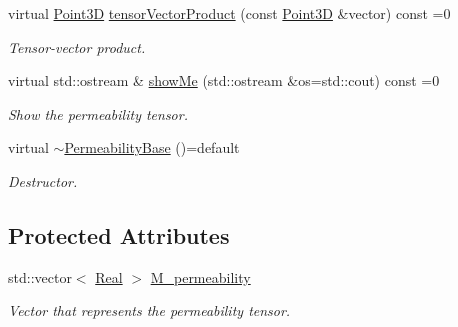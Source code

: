 \begin{DoxyCompactItemize}
virtual \hyperlink{classFVCode3D_1_1Point3D}{Point3D} \hyperlink{classFVCode3D_1_1PermeabilityBase_a1c77d0168dd4ee2e3a1ce922e0c1725c}{tensor\+Vector\+Product} (const \hyperlink{classFVCode3D_1_1Point3D}{Point3D} \&vector) const =0
\begin{DoxyCompactList}\small\item\em Tensor-\/vector product. \end{DoxyCompactList}\item 
virtual std\+::ostream \& \hyperlink{classFVCode3D_1_1PermeabilityBase_a4f06952af19c0100b6b6043fa1f8f97a}{show\+Me} (std\+::ostream \&os=std\+::cout) const =0
\begin{DoxyCompactList}\small\item\em Show the permeability tensor. \end{DoxyCompactList}\item 
virtual \hyperlink{classFVCode3D_1_1PermeabilityBase_ae22dcf323e59c47090460a981ac9e84b}{$\sim$\+Permeability\+Base} ()=default
\begin{DoxyCompactList}\small\item\em Destructor. \end{DoxyCompactList}\end{DoxyCompactItemize}
\subsection*{Protected Attributes}
\begin{DoxyCompactItemize}
\item 
std\+::vector$<$ \hyperlink{namespaceFVCode3D_a40c1f5588a248569d80aa5f867080e83}{Real} $>$ \hyperlink{classFVCode3D_1_1PermeabilityBase_aef595aa25abfeaf51e8d242e5de2055d}{M\+\_\+permeability}
\begin{DoxyCompactList}\small\item\em Vector that represents the permeability tensor. \end{DoxyCompactList}\end{DoxyCompactItemize}
